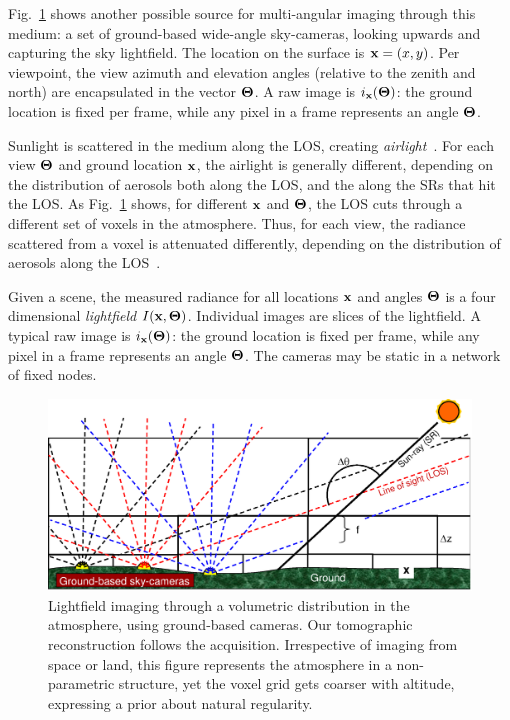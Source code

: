 \documentclass[10pt,twocolumn,letterpaper]{article}
\begin{document}
Fig.~\ref{fig:groundgrid} shows another possible source for multi-angular imaging through this medium: a set of ground-based wide-angle sky-cameras, looking upwards and capturing the sky lightfield. The location on the surface is ${\bf x}=(x,y)$. Per viewpoint, the view azimuth and elevation angles (relative to the zenith and north) are encapsulated in the vector ${\bf{\Theta}}$.  A raw image is $i_{\bf x}({\bf{\Theta}})$: the ground location is fixed per frame, while any pixel in a frame represents an angle ${\bf{\Theta}}$.

Sunlight is scattered in the medium along the LOS, creating {\em airlight}~\cite{fattal,narasimhan2,Hschechner2,tan}. For each view ${\bf{\Theta}}$ and ground location ${\bf x}$, the airlight is generally different, depending on the distribution of aerosols both along the LOS, and the along the SRs that hit the LOS.
As Fig.~\ref{fig:groundgrid} shows, for different ${\bf x}$ and ${\bf{\Theta}}$, the LOS cuts through a different set of voxels in the atmosphere. Thus, for each view, the radiance scattered from a voxel is attenuated differently, depending on the distribution of aerosols along the LOS~\cite{hansen}.

Given a scene, the measured radiance for all locations ${\bf x}$ and angles ${\bf{\Theta}}$ is a four dimensional {\em lightfield} $I({\bf x},{\bf{\Theta}})$. Individual images are slices of the lightfield. A typical raw image is $i_{\bf x}({\bf{\Theta}})$: the ground location is fixed per frame, while any pixel in a frame represents an angle ${\bf{\Theta}}$.
The cameras may be static in a network of fixed nodes.
\begin{figure}[b!]
   \begin{center}
\vspace{-0.4cm}
    \includegraphics[width=0.99\linewidth]{groundtomog6.eps}
    \end{center}\vspace{-1.5cm}
    \caption{\small
    Lightfield imaging through a volumetric distribution in
    the atmosphere, using ground-based cameras. Our tomographic reconstruction
    follows the acquisition. Irrespective of imaging from space or land, this figure represents the atmosphere in a non-parametric structure, yet the voxel grid gets coarser with altitude, expressing a prior about natural regularity.}
   \label{fig:groundgrid}
\end{figure}
\end{document}
